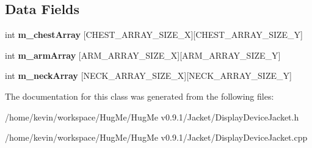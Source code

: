 \subsection*{Data Fields}
\begin{DoxyCompactItemize}
\item 
\hypertarget{classDisplayDeviceJacket_aeeb22dbc14edfa3135d2f2d0dfbd2238}{
int {\bfseries m\_\-chestArray} \mbox{[}CHEST\_\-ARRAY\_\-SIZE\_\-X\mbox{]}\mbox{[}CHEST\_\-ARRAY\_\-SIZE\_\-Y\mbox{]}}
\label{classDisplayDeviceJacket_aeeb22dbc14edfa3135d2f2d0dfbd2238}

\item 
\hypertarget{classDisplayDeviceJacket_a08e1944626872efce9af22ade970b04d}{
int {\bfseries m\_\-armArray} \mbox{[}ARM\_\-ARRAY\_\-SIZE\_\-X\mbox{]}\mbox{[}ARM\_\-ARRAY\_\-SIZE\_\-Y\mbox{]}}
\label{classDisplayDeviceJacket_a08e1944626872efce9af22ade970b04d}

\item 
\hypertarget{classDisplayDeviceJacket_a786295631af23d5b7b970edbd30b4395}{
int {\bfseries m\_\-neckArray} \mbox{[}NECK\_\-ARRAY\_\-SIZE\_\-X\mbox{]}\mbox{[}NECK\_\-ARRAY\_\-SIZE\_\-Y\mbox{]}}
\label{classDisplayDeviceJacket_a786295631af23d5b7b970edbd30b4395}

\end{DoxyCompactItemize}


The documentation for this class was generated from the following files:\begin{DoxyCompactItemize}
\item 
/home/kevin/workspace/HugMe/HugMe v0.9.1/Jacket/DisplayDeviceJacket.h\item 
/home/kevin/workspace/HugMe/HugMe v0.9.1/Jacket/DisplayDeviceJacket.cpp\end{DoxyCompactItemize}
